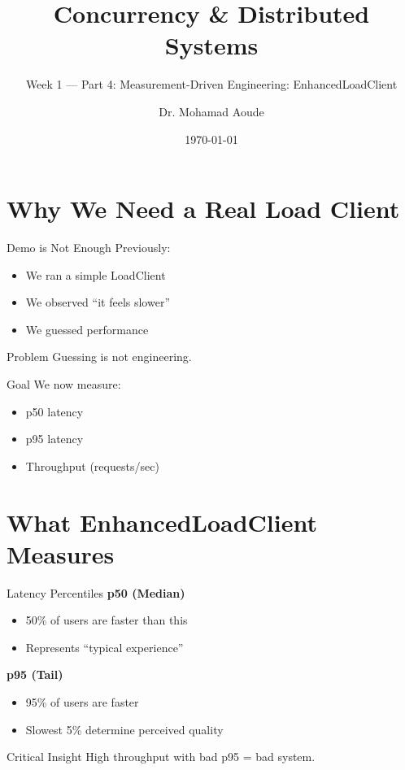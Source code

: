 \documentclass[11pt]{beamer}
\title{Concurrency \& Distributed Systems}
\subtitle{Week 1 --- Part 4: Measurement-Driven Engineering: EnhancedLoadClient}
\author{Dr. Mohamad Aoude}
\institute{Lebanese University \\ Faculty of Engineering}
\date{\today}
\begin{document}
	
	\begin{frame}
		\titlepage
	\end{frame}
	
	\section{Why We Need a Real Load Client}
	
	\begin{frame}{Demo is Not Enough}
		Previously:
		\begin{itemize}
			\item We ran a simple LoadClient
			\item We observed “it feels slower”
			\item We guessed performance
		\end{itemize}
		

		
		\begin{alertblock}{Problem}
			Guessing is not engineering.
		\end{alertblock}

		
		\begin{block}{Goal}
			We now measure:
			\begin{itemize}
				\item p50 latency
				\item p95 latency
				\item Throughput (requests/sec)
			\end{itemize}
		\end{block}
	\end{frame}
	
	\section{What EnhancedLoadClient Measures}
	
	\begin{frame}{Latency Percentiles}
		\textbf{p50 (Median)}
		\begin{itemize}
			\item 50\% of users are faster than this
			\item Represents “typical experience”
		\end{itemize}
		

		
		\textbf{p95 (Tail)}
		\begin{itemize}
			\item 95\% of users are faster
			\item Slowest 5\% determine perceived quality
		\end{itemize}

		
		\begin{alertblock}{Critical Insight}
			High throughput with bad p95 = bad system.
		\end{alertblock}
	\end{frame}
	
\end{document}
